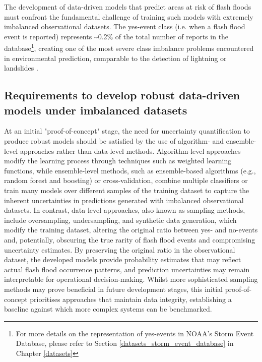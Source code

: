 The development of data-driven models that predict areas at risk of flash floods must confront the fundamental challenge of training such models with extremely imbalanced observational datasets. The yes-event class (i.e. when a flash flood event is reported) represents \sim0.2\% of the total number of reports in the database\footnote{For more details on the representation of yes-events in NOAA's Storm Event Database, please refer to Section \ref{datasets_storm_event_database} in Chapter \ref{datasets}}, creating one of the most severe class imbalance problems encountered in environmental prediction, comparable to the detection of lightning \citep{Cavaiola_2024} or landslides \citep{Xu_2022, Agrawal_2017, Zhang_2022, Gupta_2023}. 

\subsection{Requirements to develop robust data-driven models under imbalanced datasets}

At  an initial "proof-of-concept" stage, the need for uncertainty quantification to produce robust models should be satisfied by the use of algorithm- and ensemble-level approaches rather than data-level methods. Algorithm-level approaches modify the learning process through techniques such as weighted learning functions, while ensemble-level methods, such as ensemble-based algorithms (e.g., random forest and boosting) or cross-validation, combine multiple classifiers or train many models over different samples of the training dataset to capture the inherent uncertainties in predictions generated with imbalanced observational datasets. In contrast, data-level approaches, also known as sampling methods, include oversampling, undersampling, and synthetic data generation, which modify the training dataset, altering the original ratio between yes- and no-events and, potentially, obscuring the true rarity of flash flood events and compromising uncertainty estimates. By preserving the original ratio in the observational dataset, the developed models provide probability estimates that may reflect actual flash flood occurrence patterns, and prediction uncertainties may remain interpretable for operational decision-making. Whilst more sophisticated sampling methods may prove beneficial in future development stages, this initial proof-of-concept prioritises approaches that maintain data integrity, establishing a baseline against which more complex systems can be benchmarked.

